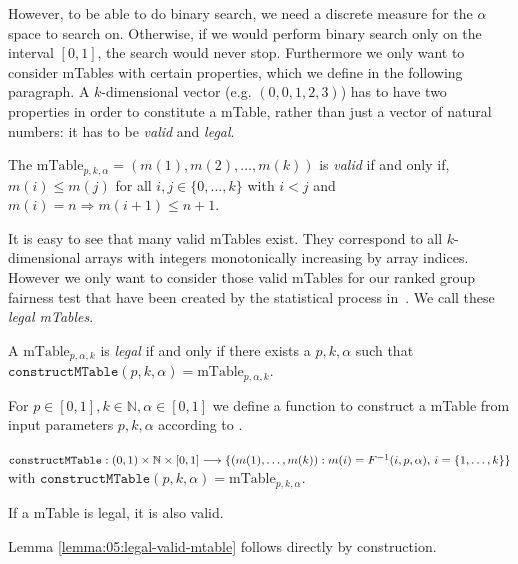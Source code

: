 
However, to be able to do binary search, we need a discrete measure for the $\alpha$ space to search on. Otherwise, if we would perform binary search only on the interval $[0,1]$, the search would never stop.
%
Furthermore we only want to consider mTables with certain properties, which we define in the following paragraph. 
%
A $k$-dimensional vector (e.g. $(0,0,1,2,3)$) has to have two properties in order to constitute a mTable, rather than just a vector of natural numbers: it has to be \emph{valid} and \emph{legal}.
%
\begin{definition}
	\label{def:05:valid-mtable}
	The $\text{mTable}_{p,k,\alpha}=(m(1) , m(2) , \ldots , m(k))$ is \emph{valid} if and only if, $m(i) \leq m(j)$ for all $i,j \in \lbrace 0, \ldots, k \rbrace$ with $i < j$ and $m(i)=n \Rightarrow m(i+1) \leq n+1$.
\end{definition}
\noindent It is easy to see that many valid mTables exist.
%
They correspond to all $k$-dimensional arrays with integers monotonically increasing by array indices.
%
However we only want to consider those valid mTables for our ranked group fairness test that have been created by the statistical process in~\citet{yang2017measuring}.
%
We call these \textit{legal mTables}.
%
\begin{definition}
	\label{def:05:legal-mtable}
	A $\text{mTable}_{p,\alpha,k}$ is \textit{legal} if and only if there exists a $p,k,\alpha$ such that
	$\texttt{constructMTable}(p,k,\alpha)=\text{mTable}_{p,\alpha,k}$.
\end{definition}
%
\begin{definition}[constructMTable]
	\label{def:05:construct-mtable-single-test}
	For $p\in [0,1], k \in \mathbb{N}, \alpha \in [0,1]$ we define a function to construct a mTable from input parameters $p, k, \alpha$ according to \cite{yang2017measuring}.
	
	\noindent$\texttt{constructMTable} : \\ (0,1) \times \mathbb{N} \times [0,1] \longrightarrow \lbrace (m(1) ,\ldots, m(k)): m(i) = F^{-1}(i,p,\alpha), \, i = \{1,\ldots,k\}\rbrace$ \\
	with $\texttt{constructMTable}(p,k,\alpha)=\text{mTable}_{p,k,\alpha}$.
\end{definition}
%
\begin{lemma}
	\label{lemma:05:legal-valid-mtable}
	If a mTable is legal, it is also valid.
\end{lemma}
%
\noindent Lemma \ref{lemma:05:legal-valid-mtable} follows directly by construction.

